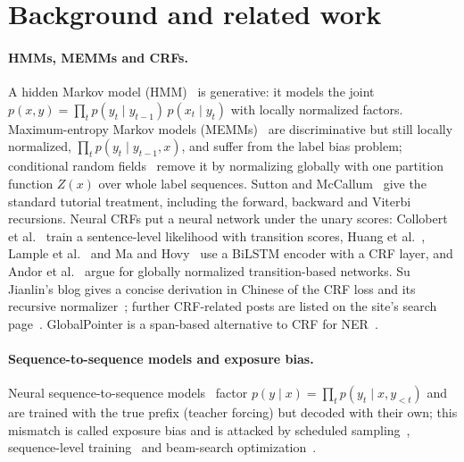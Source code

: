 \documentclass[11pt,a4paper]{article}
\begin{document}
\section{Background and related work}
\label{sec:related}

\paragraph{HMMs, MEMMs and CRFs.}
A hidden Markov model (HMM)~\cite{rabiner1989hmm} is generative: it models the joint $p(x,y)=\prod_tp(y_t\mid y_{t-1})\,p(x_t\mid y_t)$ with locally normalized factors.
Maximum-entropy Markov models (MEMMs)~\cite{mccallum2000memm} are discriminative but still locally normalized, $\prod_tp(y_t\mid y_{t-1},x)$, and suffer from the label bias problem; conditional random fields~\cite{lafferty2001crf} remove it by normalizing globally with one partition function $Z(x)$ over whole label sequences.
Sutton and McCallum~\cite{sutton2012crf} give the standard tutorial treatment, including the forward, backward and Viterbi recursions.
Neural CRFs put a neural network under the unary scores: Collobert et al.~\cite{collobert2011nlp} train a sentence-level likelihood with transition scores, Huang et al.~\cite{huang2015bilstmcrf}, Lample et al.~\cite{lample2016ner} and Ma and Hovy~\cite{ma2016bilstmcnnscrf} use a BiLSTM encoder with a CRF layer, and Andor et al.~\cite{andor2016global} argue for globally normalized transition-based networks.
Su Jianlin's blog gives a concise derivation in Chinese of the CRF loss and its recursive normalizer~\cite{su2017crf}; further CRF-related posts are listed on the site's search page~\cite{su2018search}. GlobalPointer is a span-based alternative to CRF for NER~\cite{su2022globalpointer}.

\paragraph{Sequence-to-sequence models and exposure bias.}
Neural sequence-to-sequence models~\cite{sutskever2014seq2seq,bahdanau2015nmt,vaswani2017attention} factor $p(y\mid x)=\prod_tp(y_t\mid x,y_{<t})$ and are trained with the true prefix (teacher forcing) but decoded with their own; this mismatch is called exposure bias and is attacked by scheduled sampling~\cite{bengio2015scheduled}, sequence-level training~\cite{ranzato2016mixer} and beam-search optimization~\cite{wiseman2016bso}.
\end{document}
